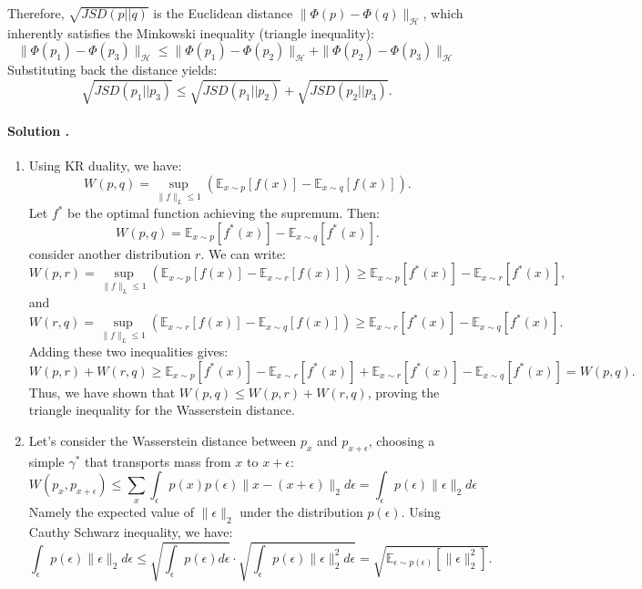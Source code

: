 \documentclass{article}
\newcounter{solutionCount}
\newcommand{\solution}[1]{
    \stepcounter{solutionCount}
    \paragraph{Solution \thesolutionCount.}
    {
        #1
    }
}
\begin{document}
{\begin{enumerate}
        Therefore, $\sqrt{JSD(p||q)}$ is the Euclidean distance $\|\Phi(p) - \Phi(q)\|_{\mathcal{H}}$, which inherently satisfies the Minkowski inequality (triangle inequality):
        \[
        \|\Phi(p_1) - \Phi(p_3)\|_{\mathcal{H}} \le \|\Phi(p_1) - \Phi(p_2)\|_{\mathcal{H}} + \|\Phi(p_2) - \Phi(p_3)\|_{\mathcal{H}}
        \]
        Substituting back the distance yields:
        \[
        \sqrt{JSD(p_1||p_3)} \le \sqrt{JSD(p_1||p_2)} + \sqrt{JSD(p_2||p_3)}.
        \]

    \end{enumerate}
}

\solution{
    \begin{enumerate}
        \item Using KR duality, we have:
        \[
        W(p, q) = \sup_{\|f\|_L \le 1} \left( \mathbb{E}_{x \sim p}[f(x)] - \mathbb{E}_{x \sim q}[f(x)] \right).
        \]
        Let \(f^*\) be the optimal function achieving the supremum. Then:
        \[
        W(p, q) = \mathbb{E}_{x \sim p}[f^*(x)] - \mathbb{E}_{x \sim q}[f^*(x)].
        \]
        consider another distribution \(r\). We can write:
        \[
        W(p, r) = \sup_{\|f\|_L \le 1} \left( \mathbb{E}_{x \sim p}[f(x)] - \mathbb{E}_{x \sim r}[f(x)] \right) \ge \mathbb{E}_{x \sim p}[f^*(x)] - \mathbb{E}_{x \sim r}[f^*(x)],
        \]
        and
        \[
        W(r, q) = \sup_{\|f\|_L \le 1} \left( \mathbb{E}_{x \sim r}[f(x)] - \mathbb{E}_{x \sim q}[f(x)] \right) \ge \mathbb{E}_{x \sim r}[f^*(x)] - \mathbb{E}_{x \sim q}[f^*(x)].
        \]
        Adding these two inequalities gives:
        \[
        W(p, r) + W(r, q) \ge \mathbb{E}_{x \sim p}[f^*(x)] - \mathbb{E}_{x \sim r}[f^*(x)] + \mathbb{E}_{x \sim r}[f^*(x)] - \mathbb{E}_{x \sim q}[f^*(x)] = W(p, q).
        \]
            Thus, we have shown that \(W(p, q) \le W(p, r) + W(r, q)\), proving the triangle inequality for the Wasserstein distance.
        \item Let's consider the Wasserstein distance between \(p_x\) and \(p_{x+\epsilon}\), choosing a simple \(\gamma^*\) that transports mass from \(x\) to \(x + \epsilon\):
        \[W(p_x, p_{x+\epsilon}) \le \sum_{x} \int_{\epsilon} p(x) p(\epsilon) \|x - (x + \epsilon)\|_2 d\epsilon = \int_{\epsilon} p(\epsilon) \|\epsilon\|_2 d\epsilon\]
        Namely the expected value of \(\|\epsilon\|_2\) under the distribution \(p(\epsilon)\). Using Cauthy Schwarz inequality, we have:
        \[
        \int_{\epsilon} p(\epsilon) \|\epsilon\|_2 d\epsilon \le \sqrt{\int_{\epsilon} p(\epsilon) d\epsilon} \cdot \sqrt{\int_{\epsilon} p(\epsilon) \|\epsilon\|_2^2 d\epsilon} = \sqrt{\mathbb{E}_{\epsilon \sim p(\epsilon)}[\|\epsilon\|_2^2]}.
\]
\end{enumerate}}
\end{document}
